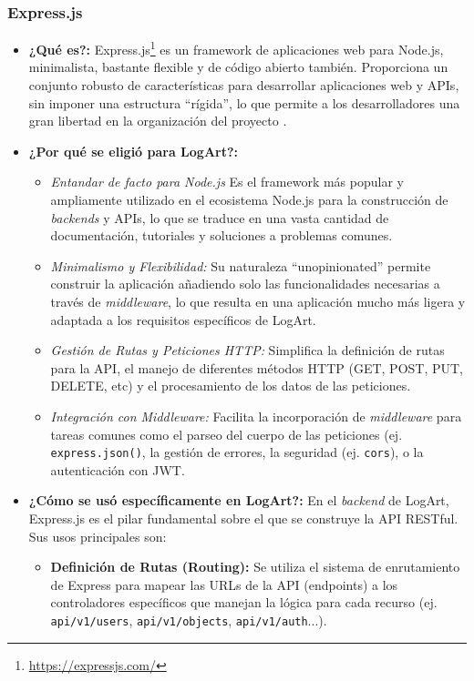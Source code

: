 \subsubsection{Express.js}
\label{sec:expressjs}

\begin{itemize}
    \item \textbf{¿Qué es?:} Express.js\footnote{\url{https://expressjs.com/}} es un framework de aplicaciones web para Node.js, minimalista, bastante flexible y de código abierto también. Proporciona un conjunto robusto de características para desarrollar aplicaciones web y APIs, sin imponer una estructura ``rígida'', lo que permite a los desarrolladores una gran libertad en la organización del proyecto \cite{kinstaQueEsExpress}.
    \item \textbf{¿Por qué se eligió para LogArt?:}
        \begin{itemize}
            \item \textit{Entandar de facto para Node.js} Es el framework más popular y ampliamente utilizado en el ecosistema Node.js para la construcción de \textit{backends} y APIs, lo que se traduce en una vasta cantidad de documentación, tutoriales y soluciones a problemas comunes.
            \item \textit{Minimalismo y Flexibilidad:} Su naturaleza ``unopinionated'' permite construir la aplicación añadiendo solo las funcionalidades necesarias a través de \textit{middleware}, lo que resulta en una aplicación mucho más ligera y adaptada a los requisitos específicos de LogArt.
            \item \textit{Gestión de Rutas y Peticiones HTTP:} Simplifica la definición de rutas para la API, el manejo de diferentes métodos HTTP (GET, POST, PUT, DELETE, etc) y el procesamiento de los datos de las peticiones.
            \item \textit{Integración con Middleware:} Facilita la incorporación de \textit{middleware} para tareas comunes como el parseo del cuerpo de las peticiones (ej. \texttt{express.json()}, la gestión de errores, la seguridad (ej. \texttt{cors}), o la autenticación con JWT.
        \end{itemize}
    \item \textbf{¿Cómo se usó específicamente en LogArt?:}
    En el \textit{backend} de LogArt, Express.js es el pilar fundamental sobre el que se construye la API RESTful. Sus usos principales son:
        \begin{itemize}
            \item \textbf{Definición de Rutas (Routing):} Se utiliza el sistema de enrutamiento de Express para mapear las URLs de la API (endpoints) a los controladores específicos que manejan la lógica para cada recurso (ej. \texttt{api/v1/users}, \texttt{api/v1/objects}, \texttt{api/v1/auth}...).

\end{itemize}
\end{itemize}
